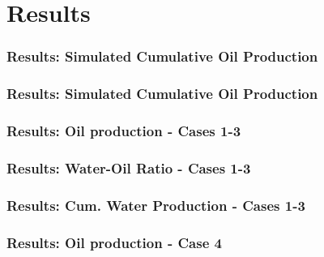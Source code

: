 \section{Results}

\begin{frame}
    \frametitle{Results: Simulated Cumulative Oil Production}
    \footnotesize
    \centerline{}
\end{frame}


\begin{frame}
    \frametitle{Results: Simulated Cumulative Oil Production}
    \footnotesize
    \centerline{}
\end{frame}


\begin{frame}[label=oilprod13]
    \frametitle{Results: Oil production - Cases 1-3}
    \centerline{}
\end{frame}


\begin{frame}[label=wor13]
    \frametitle{Results: Water-Oil Ratio - Cases 1-3}
    \centerline{}
\end{frame}
 

\begin{frame}[label=cumwat13]
    \frametitle{Results: Cum. Water Production - Cases 1-3}
    \centerline{}
\end{frame}

\begin{frame}
    \frametitle{Results: Oil production - Case 4}
    \centerline{}
\end{frame}

